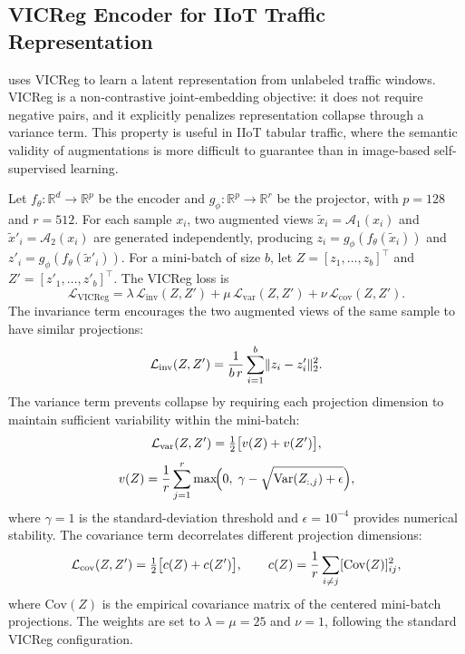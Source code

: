 \subsection{VICReg Encoder for IIoT Traffic Representation}

\method{} uses VICReg \cite{bardes2022vicreg} to learn a latent representation from unlabeled traffic windows. VICReg is a non-contrastive joint-embedding objective: it does not require negative pairs, and it explicitly penalizes representation collapse through a variance term. This property is useful in IIoT tabular traffic, where the semantic validity of augmentations is more difficult to guarantee than in image-based self-supervised learning.

Let $f_\theta : \mathbb{R}^{d} \rightarrow \mathbb{R}^{p}$ be the encoder and $g_\phi : \mathbb{R}^{p} \rightarrow \mathbb{R}^{r}$ be the projector, with $p = 128$ and $r = 512$. For each sample $x_i$, two augmented views $\tilde{x}_i = \mathcal{A}_1(x_i)$ and $\tilde{x}'_i = \mathcal{A}_2(x_i)$ are generated independently, producing $z_i = g_\phi(f_\theta(\tilde{x}_i))$ and $z'_i = g_\phi(f_\theta(\tilde{x}'_i))$. For a mini-batch of size $b$, let $Z = [z_1,\dots,z_b]^\top$ and $Z' = [z'_1,\dots,z'_b]^\top$. The VICReg loss is
\begin{equation}
\mathcal{L}_{\mathrm{VICReg}} = \lambda\,\mathcal{L}_{\mathrm{inv}}(Z,Z') + \mu\,\mathcal{L}_{\mathrm{var}}(Z,Z') + \nu\,\mathcal{L}_{\mathrm{cov}}(Z,Z').
\label{eq:vicreg}
\end{equation}
The invariance term encourages the two augmented views of the same sample to have similar projections:
\begin{equation}
\mathcal{L}_{\mathrm{inv}}(Z,Z') = \frac{1}{b\,r}\sum_{i=1}^{b} \lVert z_i - z'_i \rVert_2^2 .
\end{equation}
The variance term prevents collapse by requiring each projection dimension to maintain sufficient variability within the mini-batch:
\begin{equation}
\mathcal{L}_{\mathrm{var}}(Z,Z') = \tfrac{1}{2}\bigl[v(Z) + v(Z')\bigr],
\end{equation}
\begin{equation}
v(Z) = \frac{1}{r}\sum_{j=1}^{r} \max\!\Bigl(0,\; \gamma - \sqrt{\mathrm{Var}(Z_{:,j}) + \epsilon}\Bigr),
\end{equation}
where $\gamma = 1$ is the standard-deviation threshold and $\epsilon = 10^{-4}$ provides numerical stability. The covariance term decorrelates different projection dimensions:
\begin{equation}
\mathcal{L}_{\mathrm{cov}}(Z,Z') = \tfrac{1}{2}\bigl[c(Z) + c(Z')\bigr], \qquad
c(Z) = \frac{1}{r}\sum_{i \neq j} [\mathrm{Cov}(Z)]_{ij}^2 ,
\end{equation}
where $\mathrm{Cov}(Z)$ is the empirical covariance matrix of the centered mini-batch projections.  The weights are set to $\lambda = \mu = 25$ and $\nu = 1$, following the standard VICReg configuration.

